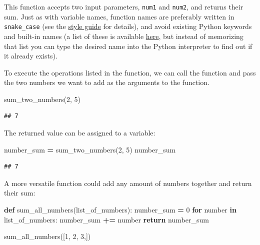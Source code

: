 \documentclass[]{Nemilov}
\newenvironment{Shaded}{\begin{snugshade}}{\end{snugshade}}
\newcommand{\ControlFlowTok}[1]{\textcolor[rgb]{0.13,0.29,0.53}{\textbf{#1}}}
\newcommand{\DecValTok}[1]{\textcolor[rgb]{0.00,0.00,0.81}{#1}}
\newcommand{\KeywordTok}[1]{\textcolor[rgb]{0.13,0.29,0.53}{\textbf{#1}}}
\newcommand{\NormalTok}[1]{#1}
\newcommand{\OperatorTok}[1]{\textcolor[rgb]{0.81,0.36,0.00}{\textbf{#1}}}
\begin{document}
This function accepts two input parameters, \texttt{num1} and \texttt{num2}, and returns
their sum. Just as with variable names, function names are preferably written
in \texttt{snake\_case} (see the \protect\hyperlink{style}{style guide} for details), and avoid existing
Python keywords and built-in names (a list of these is available
\href{https://stackoverflow.com/a/22864250/2166823}{here}, but instead of memorizing that list you can type
the desired name into the Python interpreter to find out if it already exists).

To execute the operations listed in the function, we can call the function
and pass the two numbers we want to add as the arguments to the function.

\begin{Shaded}
\begin{Highlighting}[]
\NormalTok{sum_two_numbers(}\DecValTok{2}\NormalTok{, }\DecValTok{5}\NormalTok{)}
\end{Highlighting}
\end{Shaded}

\begin{verbatim}
## 7
\end{verbatim}

The returned value can be assigned to a variable:

\begin{Shaded}
\begin{Highlighting}[]
\NormalTok{number_sum }\OperatorTok{=}\NormalTok{ sum_two_numbers(}\DecValTok{2}\NormalTok{, }\DecValTok{5}\NormalTok{)}
\NormalTok{number_sum}
\end{Highlighting}
\end{Shaded}

\begin{verbatim}
## 7
\end{verbatim}

A more versatile function could add any amount of numbers together and return
their sum:

\begin{Shaded}
\begin{Highlighting}[]
\KeywordTok{def}\NormalTok{ sum_all_numbers(list_of_numbers):}
\NormalTok{    number_sum }\OperatorTok{=} \DecValTok{0}
    \ControlFlowTok{for}\NormalTok{ number }\KeywordTok{in}\NormalTok{ list_of_numbers:}
\NormalTok{        number_sum }\OperatorTok{+=}\NormalTok{ number}
    \ControlFlowTok{return}\NormalTok{ number_sum}

\NormalTok{sum_all_numbers([}\DecValTok{1}\NormalTok{, }\DecValTok{2}\NormalTok{, }\DecValTok{3}\NormalTok{,])}
\end{Highlighting}
\end{Shaded}
\end{document}

